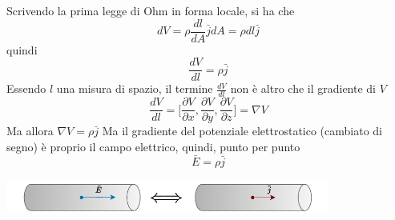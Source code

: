 \documentclass[10pt, letterpaper]{report}
\begin{document}
Scrivendo la prima legge di Ohm in forma locale, si ha che 
$$dV=\rho\frac{dl}{dA}\bar j dA=\rho dl\bar j $$
quindi 
$$ \frac{dV}{dl}=\rho \bar j$$
Essendo $l$ una misura di spazio, il termine $\frac{dV}{dl}$ non è altro che il gradiente di $V$
$$ \frac{dV}{dl}=\Bigg [
    \frac{\partial V}{\partial x},\frac{\partial V}{\partial y},\frac{\partial V}{\partial z}
\Bigg]=\nabla V$$
Ma allora $\nabla V = \rho \bar j$
Ma il gradiente del potenziale elettrostatico (cambiato di segno) è proprio il campo elettrico, quindi, punto per punto 
$$ \bar E = \rho \bar j$$
\begin{center}
    \includegraphics[width=0.8\textwidth]{images/campoCorrente.pdf}
\end{center}
\end{document}
